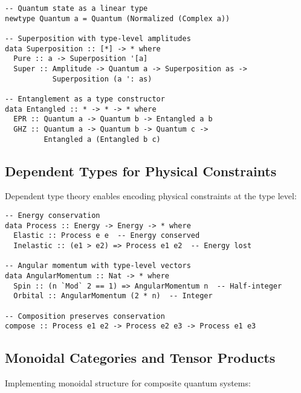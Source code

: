 \begin{definition}
\begin{verbatim}
-- Quantum state as a linear type
newtype Quantum a = Quantum (Normalized (Complex a))

-- Superposition with type-level amplitudes
data Superposition :: [*] -> * where
  Pure :: a -> Superposition '[a]
  Super :: Amplitude -> Quantum a -> Superposition as -> 
           Superposition (a ': as)

-- Entanglement as a type constructor
data Entangled :: * -> * -> * where
  EPR :: Quantum a -> Quantum b -> Entangled a b
  GHZ :: Quantum a -> Quantum b -> Quantum c -> 
         Entangled a (Entangled b c)
\end{verbatim}
\end{definition}

\subsection{Dependent Types for Physical Constraints}

Dependent type theory enables encoding physical constraints at the type level:

\begin{example}
\begin{verbatim}
-- Energy conservation
data Process :: Energy -> Energy -> * where
  Elastic :: Process e e  -- Energy conserved
  Inelastic :: (e1 > e2) => Process e1 e2  -- Energy lost
  
-- Angular momentum with type-level vectors
data AngularMomentum :: Nat -> * where
  Spin :: (n `Mod` 2 == 1) => AngularMomentum n  -- Half-integer
  Orbital :: AngularMomentum (2 * n)  -- Integer

-- Composition preserves conservation
compose :: Process e1 e2 -> Process e2 e3 -> Process e1 e3
\end{verbatim}
\end{example}

\subsection{Monoidal Categories and Tensor Products}

Implementing monoidal structure for composite quantum systems:

